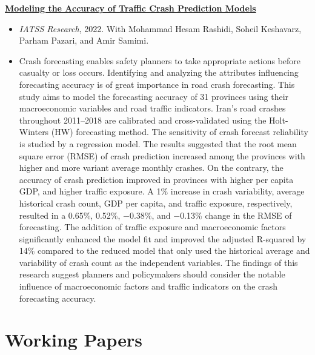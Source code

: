 \documentclass[11pt]{article}
\newcommand{\paper}[1]{\needspace{3\baselineskip}\textbf{#1}\par\vspace{0.15em}}
\newenvironment{desc}
  {\begin{itemize}[leftmargin=1.2em,topsep=0.1em,itemsep=0.15em,parsep=0pt]}
  {\end{itemize}\vspace{0.5em}}
\begin{document}
\paper{\href{https://doi.org/10.1016/j.iatssr.2022.03.004}{Modeling the Accuracy of Traffic Crash Prediction Models}}
\begin{desc}
  \item \textit{IATSS Research}, 2022. With Mohammad Hesam Rashidi, Soheil Keshavarz, Parham Pazari, and Amir Samimi.
  \item Crash forecasting enables safety planners to take appropriate actions before casualty or loss
  occurs. Identifying and analyzing the attributes influencing forecasting accuracy is of great
  importance in road crash forecasting. This study aims to model the forecasting accuracy of 31
  provinces using their macroeconomic variables and road traffic indicators. Iran's road crashes
  throughout 2011--2018 are calibrated and cross-validated using the Holt-Winters (HW) forecasting
  method. The sensitivity of crash forecast reliability is studied by a regression model. The
  results suggested that the root mean square error (RMSE) of crash prediction increased among the
  provinces with higher and more variant average monthly crashes. On the contrary, the accuracy of
  crash prediction improved in provinces with higher per capita GDP, and higher traffic exposure. A
  1\% increase in crash variability, average historical crash count, GDP per capita, and traffic
  exposure, respectively, resulted in a 0.65\%, 0.52\%, $-$0.38\%, and $-$0.13\% change in the RMSE
  of forecasting. The addition of traffic exposure and macroeconomic factors significantly enhanced
  the model fit and improved the adjusted R-squared by 14\% compared to the reduced model that only
  used the historical average and variability of crash count as the independent variables. The
  findings of this research suggest planners and policymakers should consider the notable influence
  of macroeconomic factors and traffic indicators on the crash forecasting accuracy.
\end{desc}

\section{Working Papers}
\end{document}
